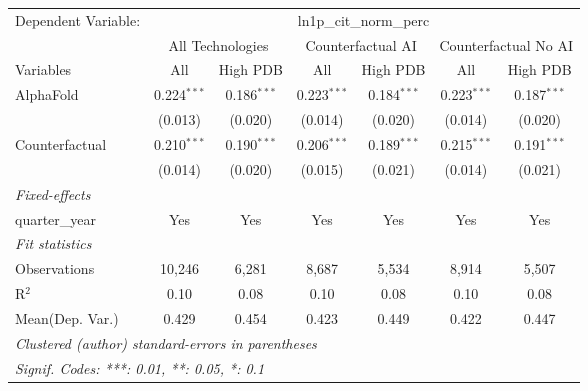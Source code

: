\begingroup
\centering
\begin{tabular}{lcccccc}
   \tabularnewline \midrule \midrule
   Dependent Variable: & \multicolumn{6}{c}{ln1p\_cit\_norm\_perc}\\
 & \multicolumn{2}{c}{All Technologies} & \multicolumn{2}{c}{Counterfactual AI} & \multicolumn{2}{c}{Counterfactual No AI} \\
\cmidrule(lr){1-1}\cmidrule(lr){2-3} \cmidrule(lr){4-5} \cmidrule(lr){6-7}
Variables & \multicolumn{1}{c}{All} & \multicolumn{1}{c}{High PDB} & \multicolumn{1}{c}{All} & \multicolumn{1}{c}{High PDB} & \multicolumn{1}{c}{All} & \multicolumn{1}{c}{High PDB} \\
\cmidrule(lr){1-1}\cmidrule(lr){2-2} \cmidrule(lr){3-3} \cmidrule(lr){4-4} \cmidrule(lr){5-5} \cmidrule(lr){6-6} \cmidrule(lr){7-7}
   AlphaFold      & 0.224$^{***}$ & 0.186$^{***}$ & 0.223$^{***}$ & 0.184$^{***}$ & 0.223$^{***}$ & 0.187$^{***}$\\   
                  & (0.013)       & (0.020)       & (0.014)       & (0.020)       & (0.014)       & (0.020)\\   
   Counterfactual & 0.210$^{***}$ & 0.190$^{***}$ & 0.206$^{***}$ & 0.189$^{***}$ & 0.215$^{***}$ & 0.191$^{***}$\\   
                  & (0.014)       & (0.020)       & (0.015)       & (0.021)       & (0.014)       & (0.021)\\   
   \midrule
   \emph{Fixed-effects}\\
   quarter\_year  & Yes           & Yes           & Yes           & Yes           & Yes           & Yes\\  
   \midrule
   \emph{Fit statistics}\\
   Observations   & 10,246        & 6,281         & 8,687         & 5,534         & 8,914         & 5,507\\  
   R$^2$          & 0.10          & 0.08          & 0.10          & 0.08          & 0.10          & 0.08\\  
Mean(Dep. Var.) & 0.429 & 0.454 & 0.423 & 0.449 & 0.422 & 0.447 \\
   \midrule \midrule
   \multicolumn{7}{l}{\emph{Clustered (author) standard-errors in parentheses}}\\
   \multicolumn{7}{l}{\emph{Signif. Codes: ***: 0.01, **: 0.05, *: 0.1}}\\
\end{tabular}
\par\endgroup
